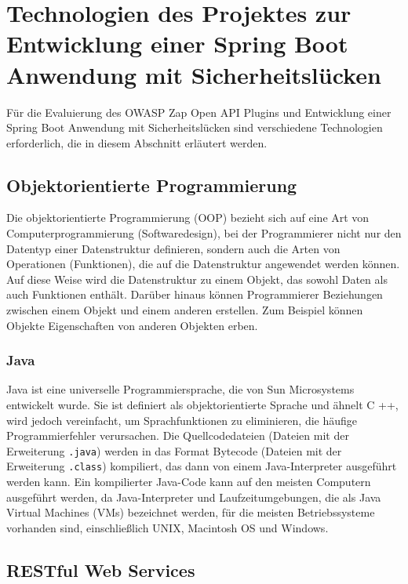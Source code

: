 \section{Technologien des Projektes zur Entwicklung einer Spring Boot Anwendung mit Sicherheitslücken}

Für die Evaluierung des OWASP Zap Open API Plugins und Entwicklung einer Spring Boot Anwendung mit Sicherheitslücken sind verschiedene Technologien erforderlich, die in diesem Abschnitt erläutert werden.

\subsection{Objektorientierte Programmierung}

Die objektorientierte Programmierung (OOP) bezieht sich auf eine Art von Computerprogrammierung (Softwaredesign), bei der Programmierer nicht nur den Datentyp einer Datenstruktur definieren, sondern auch die Arten von Operationen (Funktionen), die auf die Datenstruktur angewendet werden können. Auf diese Weise wird die Datenstruktur zu einem Objekt, das sowohl Daten als auch Funktionen enthält. Darüber hinaus können Programmierer Beziehungen zwischen einem Objekt und einem anderen erstellen. Zum Beispiel können Objekte Eigenschaften von anderen Objekten erben\cite{oop15beal}.

\subsubsection{Java}

Java ist eine universelle Programmiersprache, die von Sun Microsystems entwickelt wurde. Sie ist definiert als objektorientierte Sprache und ähnelt C ++, wird jedoch vereinfacht, um Sprachfunktionen zu eliminieren, die häufige Programmierfehler verursachen. Die Quellcodedateien (Dateien mit der Erweiterung \texttt{.java}) werden in das Format Bytecode (Dateien mit der Erweiterung \texttt{.class}) kompiliert, das dann von einem Java-Interpreter ausgeführt werden kann. Ein kompilierter Java-Code kann auf den meisten Computern ausgeführt werden, da Java-Interpreter und Laufzeitumgebungen, die als Java Virtual Machines (VMs) bezeichnet werden, für die meisten Betriebssysteme vorhanden sind, einschließlich UNIX, Macintosh OS und Windows\cite{java18beal}.

\subsection{RESTful Web Services}

